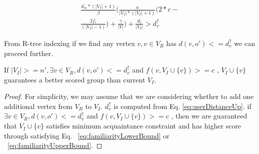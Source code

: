 \documentclass{vldb}
\begin{document}
		\begin{equation}
		\label{eq:userDistanceUp}
		\begin{split}
			\frac{d_m*(|V_I|+1)}{\beta}\Bigg(\frac{\alpha}{|V_I|*(|V_I|+1)}\bigg(2*c-
			\\
			\frac{2f_c}{(|V_I|-1)}
			\bigg)+
			\frac{\gamma}{|V|}\Bigg)+
			\frac{d_c}{|V_I|} >  d_v^\uparrow
			\end{split}
		\end{equation}
	
		 From R-tree indexing if we find any vertex $ v, v \in V_R $ has $ d(v,o') <= d_v^\uparrow$ we can proceed further. 
		\begin{Lemma}
			\label{lm:distance}
			If $ |V_I|>=n' ,  \exists v \in V_R , d(v,o')<=d_v^\uparrow$  and $ f(v,V_I \cup \{v\}) >=c $   , $ V_I \cup \{v\} $ guarantees a better scored group than current $ V_I $. 
		\end{Lemma}
		\begin{proof}
		 For simplicity, we may assume that we are considering whether to add one additional vertex  from $ V_R $ to $ V_I $. $ d_v^\uparrow $ is computed from Eq. \eqref{eq:userDistanceUp}. if $\exists v \in V_R , d(v,o')<=d_v^\uparrow$  and $ f(v,V_I \cup \{v\}) >=c $ , then we are guaranteed that $ V_I \cup \{v\} $ satisfies minimum acquaintance constraint and has higher score through satisfying Eq. ~\ref{eq:familiarityLowerBound} or ~\ref{eq:familiarityUpperBound}.
		\end{proof}
		
\end{document}

